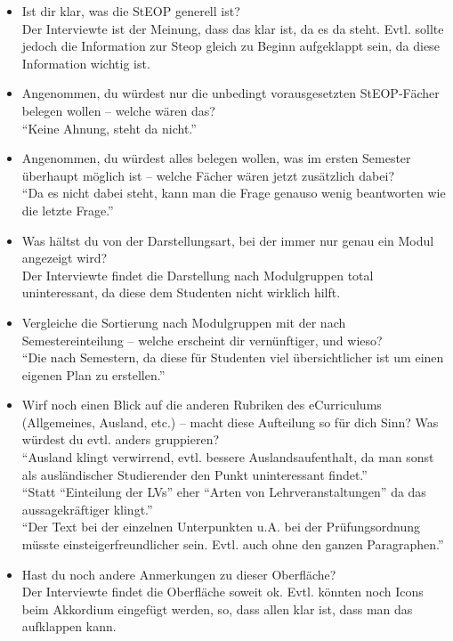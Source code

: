 \documentclass[a4paper,10pt]{scrartcl}
\begin{document}
\begin{itemize}

\item Ist dir klar, was die StEOP generell ist? \\

Der Interviewte ist der Meinung, dass das klar ist, da es da steht. Evtl. sollte jedoch die Information zur Steop gleich zu Beginn aufgeklappt sein, da diese Information wichtig ist.

\item Angenommen, du würdest nur die unbedingt vorausgesetzten StEOP-Fächer belegen wollen – welche wären das? \\

``Keine Ahnung, steht da nicht.''

\item Angenommen, du würdest alles belegen wollen, was im ersten Semester überhaupt möglich ist – welche Fächer wären jetzt zusätzlich dabei? \\

``Da es nicht dabei steht, kann man die Frage genauso wenig beantworten wie die letzte Frage.''


\item Was hältst du von der Darstellungsart, bei der immer nur genau ein Modul 
angezeigt wird? \\

Der Interviewte findet die Darstellung nach Modulgruppen total uninteressant, da diese dem Studenten nicht wirklich hilft.

\item Vergleiche die Sortierung nach Modulgruppen mit der nach Semestereinteilung
– welche erscheint dir vernünftiger, und wieso? \\

``Die nach Semestern, da diese für Studenten viel übersichtlicher ist um einen eigenen Plan zu erstellen.''


\item Wirf noch einen Blick auf die anderen Rubriken des eCurriculums (Allgemeines,
Ausland, etc.) – macht diese Aufteilung so für dich Sinn? Was würdest du evtl.
anders gruppieren? \\

``Ausland klingt verwirrend, evtl. bessere Auslandsaufenthalt, da man sonst als ausländischer Studierender den Punkt uninteressant findet.''\\

``Statt ``Einteilung der LVs'' eher ``Arten von Lehrveranstaltungen'' da das aussagekräftiger klingt.''\\

``Der Text bei der einzelnen Unterpunkten u.A. bei der Prüfungsordnung müsste einsteigerfreundlicher sein. Evtl. auch ohne den ganzen Paragraphen.''


\item Hast du noch andere Anmerkungen zu dieser Oberfläche? \\

Der Interviewte findet die Oberfläche soweit ok. Evtl. könnten noch Icons beim Akkordium eingefügt werden, so, dass allen klar ist, dass man das aufklappen kann.

\end{itemize}
\end{document}
